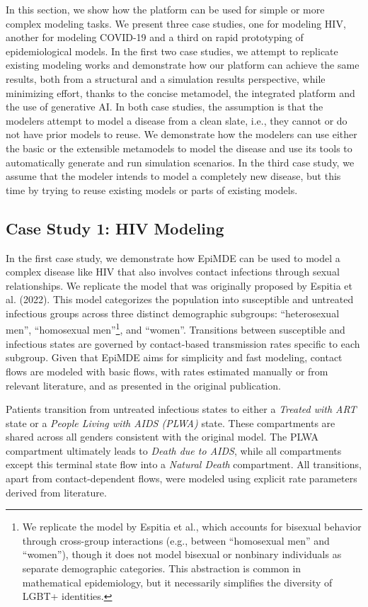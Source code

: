 
In this section, we show how the platform can be used for simple or more complex modeling tasks. We present three case studies, one for modeling HIV, another for modeling COVID-19 and a third on rapid prototyping of epidemiological models. In the first two case studies, we attempt to replicate existing modeling works and demonstrate how our platform can achieve the same results, both from a structural and a simulation results perspective, while minimizing effort, thanks to the concise metamodel, the integrated platform and the use of generative AI. In both case studies, the assumption is that the modelers attempt to model a disease from a clean slate, i.e., they cannot or do not have prior models to reuse. We demonstrate how the modelers can use either the basic or the extensible metamodels to model the disease and use its tools to automatically generate and run simulation scenarios. In the third case study, we assume that the modeler intends to model a completely new disease, but this time by trying to reuse existing models or parts of existing models.

\subsection{Case Study 1: HIV Modeling}
\label{sec:casestudy:hiv}

In the first case study, we demonstrate how EpiMDE can be used to model a complex disease like HIV that also involves contact infections through sexual relationships. We replicate the model that was originally proposed by Espitia et al. (2022)\cite{Espitia2022}. This model categorizes the population into susceptible and untreated infectious groups across three distinct demographic subgroups: ``heterosexual men'', ``homosexual men''\footnote{We replicate the model by Espitia et al., which accounts for bisexual behavior through cross-group interactions (e.g., between ``homosexual men'' and ``women''), though it does not model bisexual or nonbinary individuals as separate demographic categories. This abstraction is common in mathematical epidemiology, but it necessarily simplifies the diversity of LGBT+ identities.}, and ``women''. Transitions between susceptible and infectious states are governed by contact-based transmission rates specific to each subgroup. Given that EpiMDE aims for simplicity and fast modeling, contact flows are modeled with basic flows, with rates estimated manually or from relevant literature, and as presented in the original publication.

Patients transition from untreated infectious states to either a \textit{Treated with ART} state or a \textit{People Living with AIDS (PLWA)} state. These compartments are shared across all genders consistent with the original model. The PLWA compartment ultimately leads to \textit{Death due to AIDS}, while all compartments except this terminal state flow into a \textit{Natural Death} compartment. All transitions, apart from contact-dependent flows, were modeled using explicit rate parameters derived from literature.


